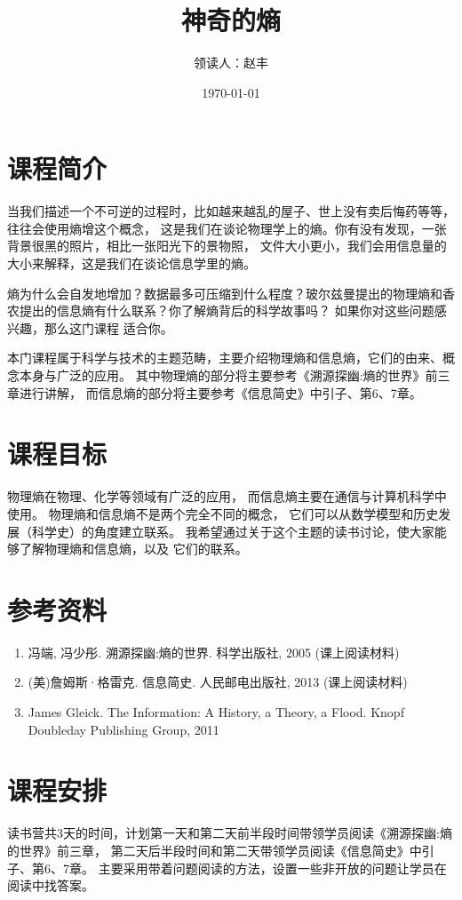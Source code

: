 \documentclass[12pt]{ctexart}
\title{神奇的熵}
\author{领读人：赵丰}
\date\today
\begin{document}

\maketitle



\section{课程简介}
当我们描述一个不可逆的过程时，比如越来越乱的屋子、世上没有卖后悔药等等，往往会使用熵增这个概念，
这是我们在谈论物理学上的熵。你有没有发现，一张背景很黑的照片，相比一张阳光下的景物照，
文件大小更小，我们会用信息量的大小来解释，这是我们在谈论信息学里的熵。

熵为什么会自发地增加？数据最多可压缩到什么程度？玻尔兹曼提出的物理熵和香农提出的信息熵有什么联系？你了解熵背后的科学故事吗？
如果你对这些问题感兴趣，那么这门课程
适合你。

本门课程属于科学与技术的主题范畴，主要介绍物理熵和信息熵，它们的由来、概念本身与广泛的应用。
其中物理熵的部分将主要参考《溯源探幽:熵的世界》前三章进行讲解，
而信息熵的部分将主要参考《信息简史》中引子、第6、7章。


\section{课程目标}
物理熵在物理、化学等领域有广泛的应用，
而信息熵主要在通信与计算机科学中使用。
物理熵和信息熵不是两个完全不同的概念，
它们可以从数学模型和历史发展（科学史）的角度建立联系。
我希望通过关于这个主题的读书讨论，使大家能够了解物理熵和信息熵，以及
它们的联系。

\section{参考资料}
\begin{enumerate}
\item 冯端, 冯少彤. 溯源探幽:熵的世界. 科学出版社, 2005 (课上阅读材料)
\item (美)詹姆斯·格雷克. 信息简史. 人民邮电出版社, 2013 (课上阅读材料)
\item James Gleick. The Information: A History, a Theory, a Flood. Knopf Doubleday Publishing Group, 2011
\end{enumerate}

\section{课程安排}
读书营共3天的时间，计划第一天和第二天前半段时间带领学员阅读《溯源探幽:熵的世界》前三章，
第二天后半段时间和第二天带领学员阅读《信息简史》中引子、第6、7章。
主要采用带着问题阅读的方法，设置一些非开放的问题让学员在阅读中找答案。
\end{document}
